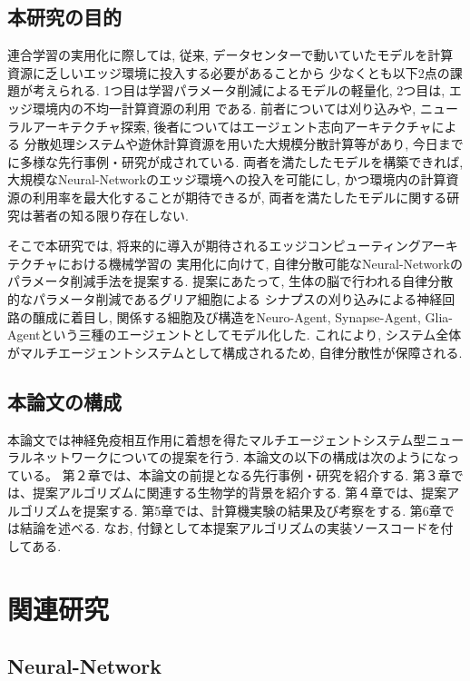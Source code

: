 \section{本研究の目的}
連合学習の実用化に際しては, 
従来, データセンターで動いていたモデルを計算資源に乏しいエッジ環境に投入する必要があることから
少なくとも以下2点の課題が考えられる.
1つ目は学習パラメータ削減によるモデルの軽量化, 
2つ目は, エッジ環境内の不均一計算資源の利用
である.
前者については刈り込みや, ニューラルアーキテクチャ探索, 後者についてはエージェント志向アーキテクチャによる
分散処理システムや遊休計算資源を用いた大規模分散計算等があり, 
今日までに多様な先行事例・研究が成されている. 
両者を満たしたモデルを構築できれば, 
大規模なNeural-Networkのエッジ環境への投入を可能にし, 
かつ環境内の計算資源の利用率を最大化することが期待できるが,  
両者を満たしたモデルに関する研究は著者の知る限り存在しない.

そこで本研究では, 将来的に導入が期待されるエッジコンピューティングアーキテクチャにおける機械学習の
実用化に向けて, 自律分散可能なNeural-Networkのパラメータ削減手法を提案する.
提案にあたって, 生体の脳で行われる自律分散的なパラメータ削減であるグリア細胞による
シナプスの刈り込みによる神経回路の醸成に着目し, 関係する細胞及び構造をNeuro-Agent, Synapse-Agent, 
Glia-Agentという三種のエージェントとしてモデル化した. 
これにより, システム全体がマルチエージェントシステムとして構成されるため, 自律分散性が保障される.
\section{本論文の構成}
本論文では神経免疫相互作用に着想を得たマルチエージェントシステム型ニューラルネットワークについての提案を行う.
 本論文の以下の構成は次のようになっている。
 第２章では、本論文の前提となる先行事例・研究を紹介する.
 第３章では、提案アルゴリズムに関連する生物学的背景を紹介する.
 第４章では、提案アルゴリズムを提案する.
 第5章では、計算機実験の結果及び考察をする.
 第6章では結論を述べる.
 なお, 付録として本提案アルゴリズムの実装ソースコードを付してある.
\chapter{関連研究}
\section{Neural-Network}
